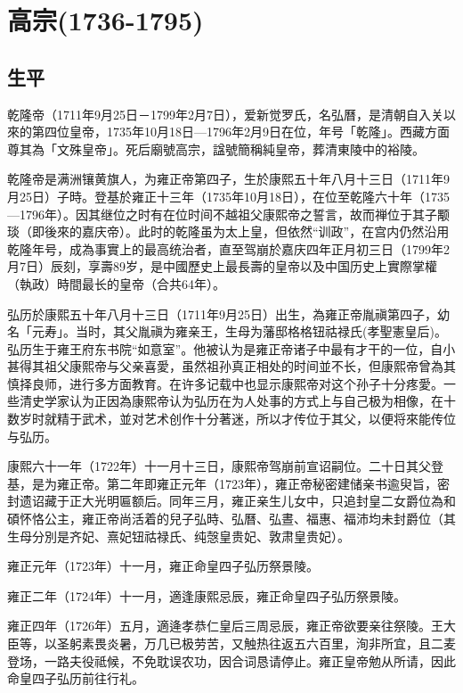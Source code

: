 
\section{高宗\tiny(1736-1795)}

\subsection{生平}

乾隆帝（1711年9月25日－1799年2月7日），爱新觉罗氏，名弘曆，是清朝自入关以來的第四位皇帝，1735年10月18日—1796年2月9日在位，年号「乾隆」。西藏方面尊其為「文殊皇帝」。死后廟號高宗，諡號簡稱純皇帝，葬清東陵中的裕陵。

乾隆帝是满洲镶黄旗人，为雍正帝第四子，生於康熙五十年八月十三日（1711年9月25日）子時。登基於雍正十三年（1735年10月18日），在位至乾隆六十年（1735—1796年）。因其继位之时有在位时间不越祖父康熙帝之誓言，故而禅位于其子颙琰（即後來的嘉庆帝）。此时的乾隆虽为太上皇，但依然“训政”，在宫内仍然沿用乾隆年号，成為事實上的最高统治者，直至驾崩於嘉庆四年正月初三日（1799年2月7日）辰刻，享壽89岁，是中國歷史上最長壽的皇帝以及中国历史上實際掌權（執政）時間最长的皇帝（合共64年）。

弘历於康熙五十年八月十三日（1711年9月25日）出生，為雍正帝胤禛第四子，幼名「元寿」。当时，其父胤禛为雍亲王，生母为藩邸格格钮祜禄氏(孝聖憲皇后)。弘历生于雍王府东书院“如意室”。他被认为是雍正帝诸子中最有才干的一位，自小甚得其祖父康熙帝与父亲喜愛，虽然祖孙真正相处的时间並不长，但康熙帝曾為其慎择良师，进行多方面教育。在许多记载中也显示康熙帝对这个孙子十分疼愛。一些清史学家认为正因為康熙帝认为弘历在为人处事的方式上与自己极为相像，在十数岁时就精于武术，並对艺术创作十分著迷，所以才传位于其父，以便将來能传位与弘历。

康熙六十一年（1722年）十一月十三日，康熙帝驾崩前宣诏嗣位。二十日其父登基，是为雍正帝。第二年即雍正元年（1723年），雍正帝秘密建储亲书逾臾旨，密封遗诏藏于正大光明匾额后。同年三月，雍正亲生儿女中，只追封皇二女爵位為和碩怀恪公主，雍正帝尚活着的兒子弘時、弘曆、弘晝、福惠、福沛均未封爵位（其生母分別是齐妃、熹妃钮祜禄氏、纯愨皇贵妃、敦肃皇贵妃）。

雍正元年（1723年）十一月，雍正命皇四子弘历祭景陵。

雍正二年（1724年）十一月，適逢康熙忌辰，雍正命皇四子弘历祭景陵。

雍正四年（1726年）五月，適逄孝恭仁皇后三周忌辰，雍正帝欲要亲往祭陵。王大臣等，以圣躬素畏炎暑，万几已极劳苦，又触热往返五六百里，洵非所宜，且二麦登场，一路夫役祗候，不免耽误农功，因合词恳请停止。雍正皇帝勉从所请，因此命皇四子弘历前往行礼。

